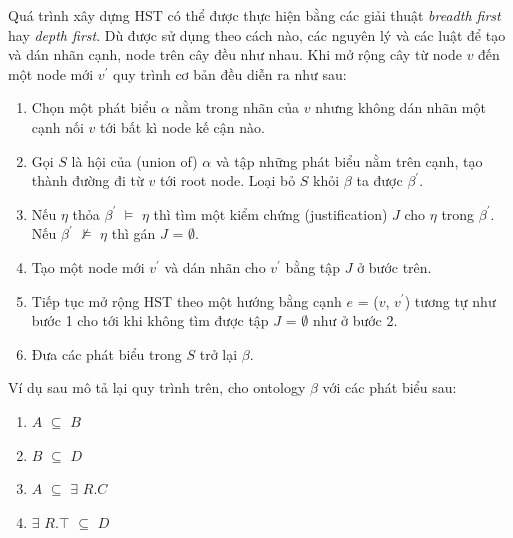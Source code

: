 		\hspace*{.05\textwidth} Quá trình xây dựng HST có thể được thực hiện bằng các giải thuật \textit{breadth first} hay \textit{depth first}. Dù được sử dụng theo cách nào, các nguyên lý và các luật để tạo và dán nhãn cạnh, node trên cây đều như nhau. Khi mở rộng cây từ node $v$ đến một node mới $v^{'}$ quy trình cơ bản đều diễn ra như sau:
		\begin{enumerate}
			\item Chọn một phát biểu $\alpha$ nằm trong nhãn của $v$ nhưng không dán nhãn một cạnh nối $v$ tới bất kì node kế cận nào.
			\item Gọi $S$ là hội của (union of) {$\alpha$} và tập những phát biểu nằm trên cạnh, tạo thành đường đi từ $v$ tới root node. Loại bỏ $S$ khỏi $\beta$ ta được $\beta^{'}$.
			\item Nếu $\eta$ thỏa $\beta^{'}$ $\models$ $\eta$ thì tìm một kiểm chứng (justification) $J$ cho $\eta$ trong $\beta^{'}$. Nếu $\beta^{'}$ $\not\models$ $\eta$ thì gán $J$ = $\emptyset$.
			\item Tạo một node mới $v^{'}$ và dán nhãn cho $v^{'}$ bằng tập $J$ ở bước trên.
			\item Tiếp tục mở rộng HST theo một hướng bằng cạnh $e$ = ($v$, $v^{'}$) tương tự như bước 1 cho tới khi không tìm được tập $J$ = $\emptyset$ như ở bước 2.
			\item Đưa các phát biểu trong $S$ trở lại $\beta$.
		\end{enumerate}
		Ví dụ sau mô tả lại quy trình trên, cho ontology $\beta$  với các phát biểu sau:
		\begin{enumerate}
			\item $A$ $\subseteq$ $B$
			\item $B$ $\subseteq$ $D$ 
			\item $A$ $\subseteq$ $\exists$ $R.C$ 
			\item $\exists$ $R.\top$ $\subseteq$ $D$
		\end{enumerate} 
		
